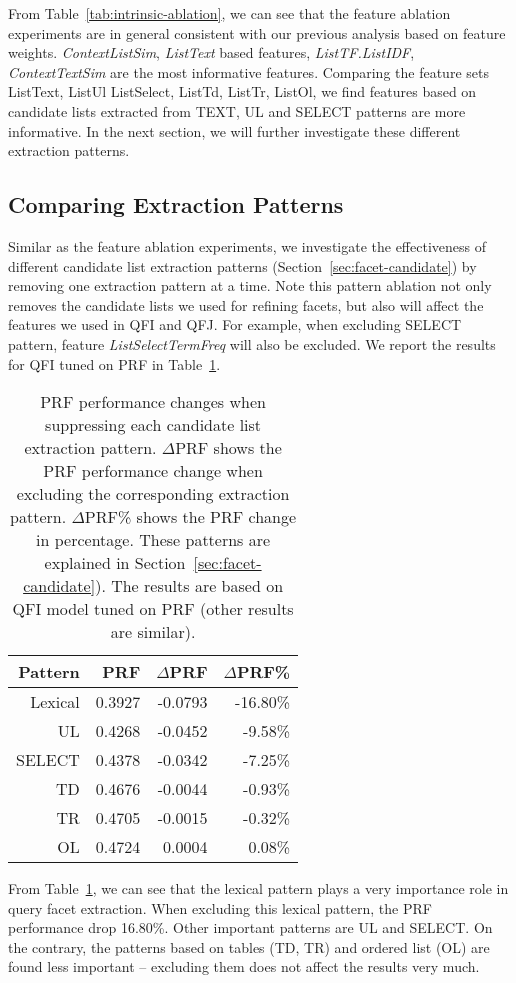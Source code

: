 From Table~\ref{tab:intrinsic-ablation}, we can see that the feature ablation experiments are in general consistent with our previous analysis based on feature weights. \textit{ContextListSim}, \textit{ListText} based features, \textit{ListTF.ListIDF}, \textit{ContextTextSim} are the most informative features. Comparing the feature sets ListText, ListUl ListSelect, ListTd, ListTr, ListOl, we find features based on candidate lists extracted from TEXT, UL and SELECT patterns are more informative. In the next section, we will further investigate these different extraction patterns.


\subsection{Comparing Extraction Patterns}
Similar as the feature ablation experiments, we investigate the effectiveness of different candidate list extraction patterns (Section~\ref{sec:facet-candidate}) by removing one extraction pattern at a time. Note this pattern ablation not only removes the candidate lists we used for refining facets, but also will affect the features we used in QFI and QFJ. For example, when excluding SELECT pattern, feature \textit{ListSelectTermFreq} will also be excluded. We report the results for QFI tuned on PRF in Table~\ref{tab:intrinsic-clists}.
\begin{table}[H]
\centering
\caption{PRF performance changes when suppressing each candidate list extraction pattern. $\Delta$PRF shows the PRF performance change when excluding the corresponding extraction pattern. $\Delta$PRF\% shows the PRF change in percentage. These patterns are explained in Section~\ref{sec:facet-candidate}). The results are based on QFI model tuned on PRF (other results are similar).}
\label{tab:intrinsic-clists}
\begin{tabular}{|r|r|r|r|} \hline
Pattern & PRF & $\Delta$PRF & $\Delta$PRF\% \\ \hline
Lexical & 0.3927 & -0.0793 & -16.80\% \\ \hline
UL & 0.4268 & -0.0452 & -9.58\% \\ \hline
SELECT & 0.4378 & -0.0342 & -7.25\% \\ \hline
TD & 0.4676 & -0.0044 & -0.93\% \\ \hline
TR & 0.4705 & -0.0015 & -0.32\% \\ \hline
OL & 0.4724 & 0.0004 & 0.08\% \\ \hline
\end{tabular}
\end{table}
From Table~\ref{tab:intrinsic-clists}, we can see that the lexical pattern plays a very importance role in query facet extraction. When excluding this lexical pattern, the PRF performance drop 16.80\%. Other important patterns are UL and SELECT. On the contrary, the patterns based on tables (TD, TR) and ordered list (OL) are found less important -- excluding them does not affect the results very much.


